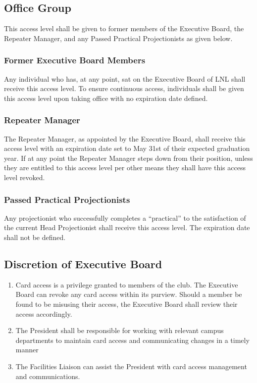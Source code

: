 \documentclass[12pt,letterpaper,oneside]{book}
\begin{document}
\subsection{Office Group}
This access level shall be given to former members of the Executive Board, the Repeater Manager, and any Passed Practical Projectionists as given below.

\subsubsection{Former Executive Board Members}
Any individual who has, at any point, sat on the Executive Board of LNL shall receive this access level. To ensure continuous access, individuals shall be given this access level upon taking office with no expiration date defined.

\subsubsection{Repeater Manager}
The Repeater Manager, as appointed by the Executive Board, shall receive this access level with an expiration date set to May 31st of their expected graduation year. If at any point the Repeater Manager steps down from their position, unless they are entitled to this access level per other means they shall have this access level revoked.

\subsubsection{Passed Practical Projectionists}
Any projectionist who successfully completes a ``practical'' to the satisfaction of the current Head Projectionist shall receive this access level. The expiration date shall not be defined.

\subsection{Discretion of Executive Board}
\begin{enumerate}
    \item Card access is a privilege granted to members of the club. The
        Executive Board can revoke any card access within its purview.
        Should a member be found to be misusing their
        access, the Executive Board shall review their access accordingly.
    \item The President shall be responsible for working with relevant campus
        departments to maintain card access and communicating changes in a timely manner
    \item The Facilities Liaison can assist the President with card access
        management and communications.
\end{enumerate}
\end{document}
